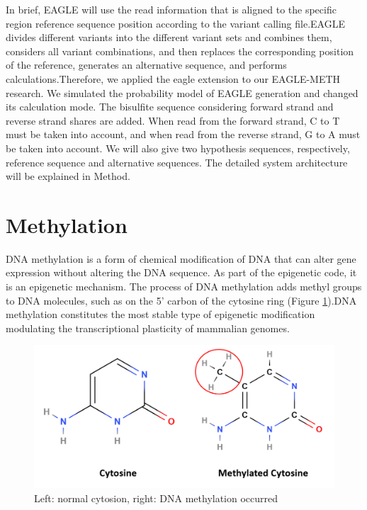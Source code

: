 \documentclass{PHlab-thesis}
\begin{document}
\par In brief, EAGLE will use the read information that is aligned to the specific region reference sequence position according to the variant calling file.EAGLE divides different variants into the different variant sets and combines them, considers all variant combinations, and then replaces the corresponding position of the reference, generates an alternative sequence, and performs calculations.Therefore, we applied the eagle extension to our EAGLE-METH research. We simulated the probability model of EAGLE generation and changed its calculation mode. The bisulfite sequence considering forward strand and reverse strand shares are added. When read from the forward strand, C to T must be taken into account, and when read from the reverse strand, G to A must be taken into account. We will also give two hypothesis sequences, respectively, reference sequence and alternative sequences. The detailed system architecture will be explained in Method.

\section{Methylation}
DNA methylation is a form of chemical modification of DNA that can alter gene expression without altering the DNA sequence. As part of the epigenetic code, it is an epigenetic mechanism. The process of DNA methylation adds methyl groups to DNA molecules, such as on the 5' carbon of the cytosine ring (Figure \ref{fig:methylation}).DNA methylation constitutes the most stable type of epigenetic modification modulating the transcriptional plasticity of mammalian genomes.

\begin{figure}[h]
  \centering
  \includegraphics[scale=0.8]{figures/1.PNG}
  \caption{Left: normal cytosion, right: DNA methylation occurred}
  \label{fig:methylation}
\end{figure}
\end{document}
